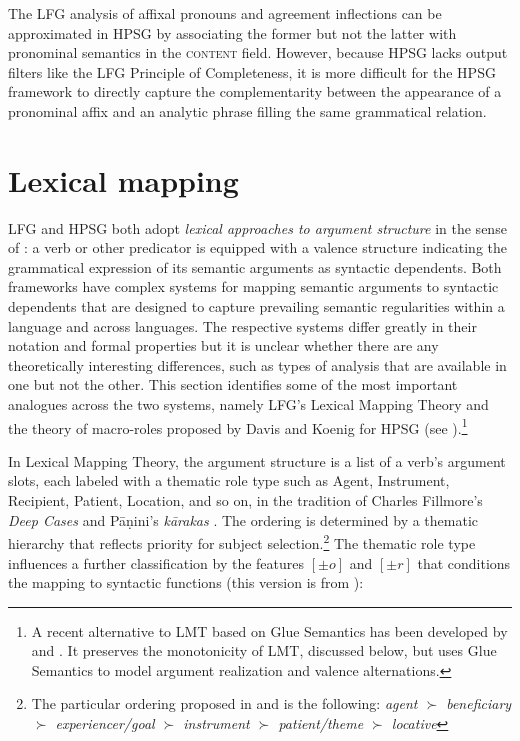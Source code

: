 
The LFG analysis of  affixal pronouns and agreement inflections can be approximated in HPSG by associating the former but not the latter with pronominal semantics in the \textsc{content} field.  However, because HPSG lacks output filters like the LFG Principle of Completeness, it is more difficult for the HPSG framework to directly capture the complementarity between the appearance of a pronominal affix and an analytic phrase filling the same grammatical relation. 
                  
\section{Lexical mapping}
LFG and HPSG both adopt \textit{lexical approaches to argument structure} in the sense of \citet{MWArgSt}: a verb or other predicator is equipped with a valence structure indicating the grammatical expression of its semantic arguments as syntactic dependents.  Both frameworks have complex systems for mapping semantic arguments to syntactic dependents that are designed to capture prevailing semantic regularities within a language and across languages.   The respective systems differ greatly in their notation and formal properties but it is unclear whether 
there are any theoretically interesting differences, such as types of analysis that are available in one but not the other.  This section identifies some of the most important  analogues across the two systems, namely LFG's Lexical Mapping Theory \citep[Chapter 14]{BATW2015a} and the theory of macro-roles proposed by Davis and Koenig for HPSG (see ).\footnote{A recent alternative to LMT based on Glue Semantics has been developed by \citet{asudeh;giorgolo-lfg12} and \citet{asudeh;ea14-lfg}. It preserves the monotonicity of LMT, discussed below, but uses Glue Semantics to model argument realization and valence alternations.}
 
In Lexical Mapping Theory, the argument structure is a list of a verb's argument slots, each labeled with a thematic role type such as Agent, Instrument, Recipient, Patient, Location, and so on, in the tradition of Charles Fillmore's \textit{Deep Cases} \citep{Fillmore68,Fillmore77} and P\={a}\d{n}ini's \textit{k\={a}rakas} \citep{kiparsky+staal:1969}.  The ordering is determined by a thematic hierarchy that reflects priority for subject selection.\footnote{The particular ordering proposed in \cite{BresnanK89a-u} and 
\cite{Bresnan+etal:2015} is the following:  
{\it agent $\succ$ beneficiary $\succ$
experiencer/goal $\succ$ instrument $\succ$ patient/theme $\succ$
locative}}  The thematic role type influences a further classification by the features $[\pm o]$ and $[\pm r]$ that conditions the mapping to syntactic functions (this version is from \citet[p. \ 331]{Bresnan+etal:2015}):

